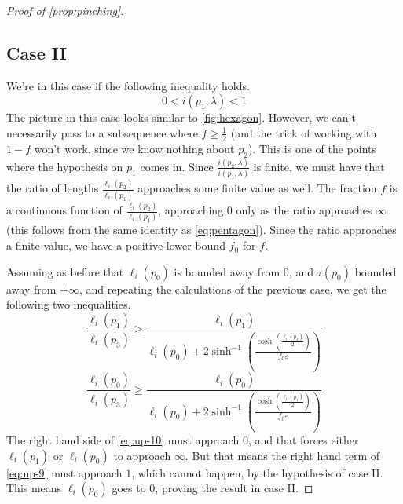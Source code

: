 \begin{proof}[Proof of \autoref{prop:pinching}]
\subsection*{Case II}
We're in this case if the following inequality holds.
\begin{equation}
  \label{eq:up-8}
  0 < i(p_1, \lambda) < 1
\end{equation}
The picture in this case looks similar to \autoref{fig:hexagon}.
However, we can't necessarily pass to a subsequence where $f \geq \frac{1}{2}$ (and the trick of working with $1-f$ won't work, since we know nothing about $p_2$).
This is one of the points where the hypothesis on $p_1$ comes in.
Since $\frac{i(p_2, \lambda)}{i(p_1, \lambda)}$ is finite, we must have that the ratio of lengths $\frac{\ell_i(p_2)}{\ell_i(p_1)}$ approaches some finite value as well.
The fraction $f$ is a continuous function of $\frac{\ell_i(p_2)}{\ell_i(p_1)}$, approaching $0$ only as the ratio approaches $\infty$ (this follows from the same identity as \eqref{eq:pentagon}). Since the ratio approaches a finite value, we have a positive lower bound $f_0$ for $f$.

Assuming as before that $\ell_i(p_0)$ is bounded away from $0$, and $\tau(p_0)$ bounded away from $\pm \infty$, and repeating the calculations of the previous case, we get the following two inequalities.
\begin{equation}
  \label{eq:up-9}
  \frac{\ell_i(p_1)}{\ell_i(p_3)} \geq \frac{\ell_i(p_1) }{\ell_i(p_0) +
  2 \sinh^{-1} \left( \frac{\cosh\left( \frac{\ell_i(p_1)}{2} \right)}{f_0 \varepsilon} \right)
  }
\end{equation}
\begin{equation}
  \label{eq:up-10}
  \frac{\ell_i(p_0)}{\ell_i(p_3)} \geq \frac{\ell_i(p_0)}{\ell_i(p_0) +
  2 \sinh^{-1} \left( \frac{\cosh\left( \frac{\ell_i(p_1)}{2} \right)}{f_0 \varepsilon} \right)
  }
\end{equation}
The right hand side of \eqref{eq:up-10} must approach $0$, and that forces either $\ell_i(p_1)$ or $\ell_i(p_0)$ to approach $\infty$.
But that means the right hand term of \eqref{eq:up-9} must approach $1$, which cannot happen, by the hypothesis of case II.
This means $\ell_i(p_0)$ goes to $0$, proving the result in case II.


\end{proof}
